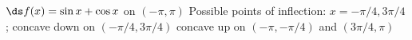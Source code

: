 {$\ds f(x) = \sin x + \cos x$ on $(-\pi,\pi)$
}
{Possible points of inflection: $x=-\pi/4,3\pi/4$;
concave down on $(-\pi/4,3\pi/4)$
concave up on $(-\pi,-\pi/4)$ and $(3\pi/4,\pi)$
}
